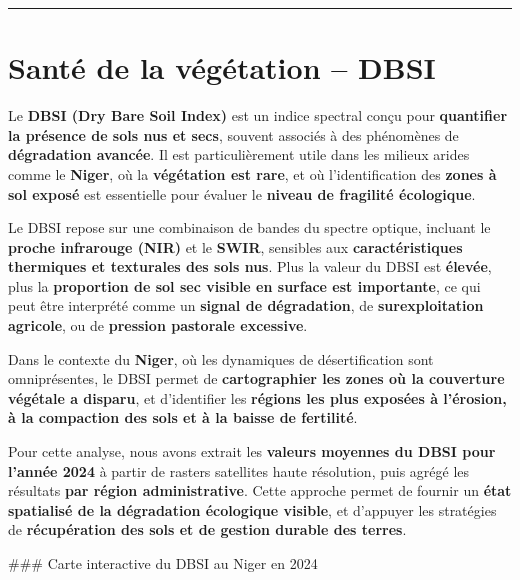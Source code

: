 \documentclass[
]{book}
\begin{document}
\begin{center}\rule{0.5\linewidth}{0.5pt}\end{center}

\section{Santé de la végétation -- DBSI}\label{santuxe9-de-la-vuxe9guxe9tation-dbsi}

Le \textbf{DBSI (Dry Bare Soil Index)} est un indice spectral conçu pour \textbf{quantifier la présence de sols nus et secs}, souvent associés à des phénomènes de \textbf{dégradation avancée}. Il est particulièrement utile dans les milieux arides comme le \textbf{Niger}, où la \textbf{végétation est rare}, et où l'identification des \textbf{zones à sol exposé} est essentielle pour évaluer le \textbf{niveau de fragilité écologique}.

Le DBSI repose sur une combinaison de bandes du spectre optique, incluant le \textbf{proche infrarouge (NIR)} et le \textbf{SWIR}, sensibles aux \textbf{caractéristiques thermiques et texturales des sols nus}. Plus la valeur du DBSI est \textbf{élevée}, plus la \textbf{proportion de sol sec visible en surface est importante}, ce qui peut être interprété comme un \textbf{signal de dégradation}, de \textbf{surexploitation agricole}, ou de \textbf{pression pastorale excessive}.

Dans le contexte du \textbf{Niger}, où les dynamiques de désertification sont omniprésentes, le DBSI permet de \textbf{cartographier les zones où la couverture végétale a disparu}, et d'identifier les \textbf{régions les plus exposées à l'érosion, à la compaction des sols et à la baisse de fertilité}.

Pour cette analyse, nous avons extrait les \textbf{valeurs moyennes du DBSI pour l'année 2024} à partir de rasters satellites haute résolution, puis agrégé les résultats \textbf{par région administrative}. Cette approche permet de fournir un \textbf{état spatialisé de la dégradation écologique visible}, et d'appuyer les stratégies de \textbf{récupération des sols et de gestion durable des terres}.

\#\#\#️ Carte interactive du DBSI au Niger en 2024
\end{document}
